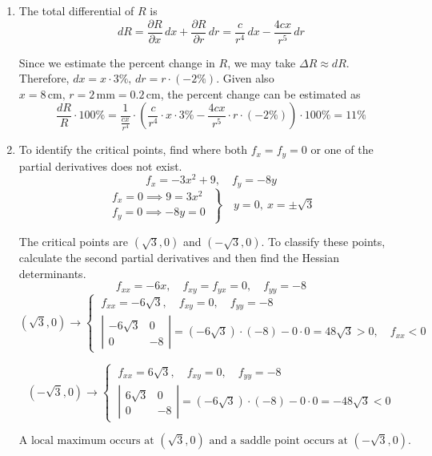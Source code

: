 \documentclass[a4paper, 12pt]{article}
\begin{document}
\begin{enumerate}[leftmargin=*,label=\textbf{\arabic*.}]
\[\frac{\partial u}{\partial\theta}=\frac{\partial u}{\partial x}\cdot\frac{\partial x}{\partial\theta}+\frac{\partial u}{\partial y}\cdot\frac{\partial y}{\partial\theta}\implies-\frac1r\frac{\partial u}{\partial\theta}=-\frac1r\left(-u_x r\sin\theta+u_y r\cos\theta\right)=u_x\sin\theta-u_y\cos\theta\]

\[\frac{\partial v}{\partial r}=u_x\sin\theta-u_y\cos\theta=-\frac1r\frac{\partial u}{\partial \theta}\]

Therefore, the Cauchy-Riemann equations hold.

\item The total differential of $R$ is
\[dR=\frac{\partial R}{\partial x}\,dx+\frac{\partial R}{\partial r}\,dr=\frac c{r^4}\,dx-\frac{4cx}{r^5}\,dr\]

Since we estimate the percent change in $R$, we may take $\Delta R\approx dR$. Therefore, $dx=x\cdot3\%,\,dr=r\cdot(-2\%)$. Given also $x=8\,\text{cm},\,r=2\, \text{mm}=0.2\,\text{cm}$, the percent change can be estimated as
\[\frac{dR}R\cdot100\%=\frac1{\frac{cx}{r^4}}\cdot\left(\frac c{r^4}\cdot x\cdot3\%-\frac{4cx}{r^5}\cdot r\cdot(-2\%)\right)\cdot100\%=\boxed{11\%}\]

\item To identify the critical points, find where both $f_x=f_y=0$ or one of the partial derivatives does not exist.
\[f_x=-3x^2+9,\quad f_y=-8y\]
\[\left.\begin{array}{c}
f_x=0\implies9=3x^2\\
f_y=0\implies-8y=0 
\end{array}\:\right\}\quad y=0,\:x=\pm\sqrt3\]

The critical points are $\left(\sqrt3,0\right)$ and $\left(-\sqrt3,0\right)$. To classify these points, calculate the second partial derivatives and then find the Hessian determinants.
\[f_{xx}=-6x,\quad f_{xy}=f_{yx}=0,\quad f_{yy}=-8\]
\[\left(\sqrt3,0\right)\rightarrow\left\{\:\begin{array}{l}
f_{xx}=-6\sqrt3,\quad f_{xy}=0,\quad f_{yy}=-8\\[1em]
\left|\begin{array}{cc}
-6\sqrt3 & 0\\
0 & -8
\end{array}\right|=\left(-6\sqrt3\right)\cdot(-8)-0\cdot0=48\sqrt3>0,\quad f_{xx}<0
\end{array}\right.\]

\[\left(-\sqrt3,0\right)\rightarrow\left\{\:\begin{array}{l}
f_{xx}=6\sqrt3,\quad f_{xy}=0,\quad f_{yy}=-8\\[1em]
\left|\begin{array}{cc}
6\sqrt3 & 0\\
0 & -8
\end{array}\right|=\left(-6\sqrt3\right)\cdot(-8)-0\cdot0=-48\sqrt3<0
\end{array}\right.\]

\[\boxed{\text{A local maximum occurs at }\left(\sqrt3,0\right)\text{ and a saddle point occurs at }\left(-\sqrt3,0\right).}\]
\end{enumerate}
\end{document}
